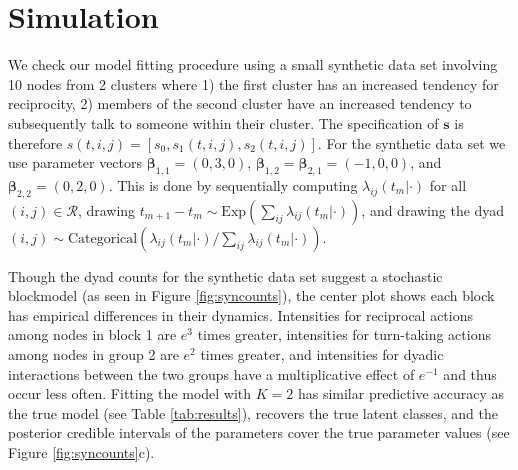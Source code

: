 \section{Simulation}

We check our model fitting procedure using a small synthetic data set involving 10 nodes from 2 clusters where 1) the first cluster has an increased tendency for reciprocity, 2) members of the second cluster have an increased tendency to subsequently talk to someone within their cluster.
The specification of $\textbf{s}$ is therefore $s(t,i,j) = [s_0, s_{1}(t,i,j), s_{2}(t,i,j)]$.
For the synthetic data set we use parameter vectors $\boldsymbol{\beta}_{1,1} = (0,3,0)$,  $\boldsymbol{\beta}_{1,2} = \boldsymbol{\beta}_{2,1} = (-1,0,0)$, and $\boldsymbol{\beta}_{2,2} = (0,2,0)$.
This is done by sequentially computing $\lambda_{ij}(t_m|\cdot)$ for all $(i,j) \in \mathcal{R}$, drawing $t_{m+1}-t_m \sim \mbox{Exp}(\sum_{ij} \lambda_{ij}(t_m|\cdot))$, and drawing the dyad $(i,j) \sim \mbox{Categorical}(\lambda_{ij}(t_m|\cdot) / \sum_{ij}\lambda_{ij}(t_m|\cdot))$.

Though the dyad counts for the synthetic data set suggest a stochastic blockmodel (as seen in Figure  \ref{fig:syncounts}),  the center plot shows each block has empirical differences in their dynamics.
Intensities for reciprocal actions among nodes in block 1 are $e^3$ times greater, intensities for turn-taking actions among nodes in group 2 are $e^2$ times greater, and intensities for dyadic interactions between the two groups have a multiplicative effect of $e^{-1}$ and thus occur less often.
Fitting the model with $K=2$ has similar  predictive accuracy as the true model (see Table \ref{tab:results}), recovers the true latent classes, and the posterior credible intervals of the parameters cover the true parameter values (see Figure \ref{fig:syncounts}c).
